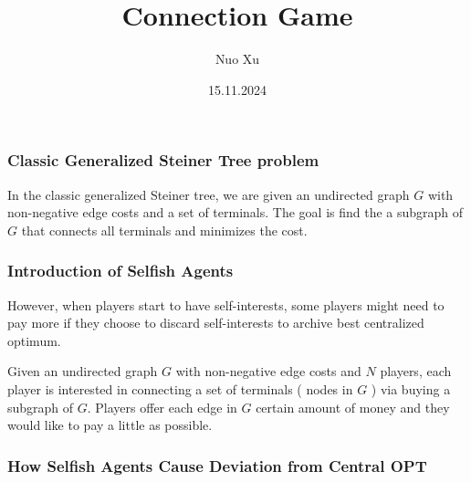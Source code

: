 \documentclass[11pt]{beamer}
\title{Connection Game}
\author{Nuo Xu}
\institute{Technical University of Munich}
\date{15.11.2024}
\begin{document}
\frame{\titlepage}

\begin{frame}
    \frametitle{Classic Generalized Steiner Tree problem}
    In the classic generalized Steiner tree, we are given an undirected graph \(G\) with non-negative edge costs and a set of terminals. The goal is find the a subgraph of \(G\) that connects all terminals and minimizes the cost. 
\end{frame}

\begin{frame}
    \frametitle{Introduction of Selfish Agents}
    However, when players start to have self-interests, some players might need to pay more if they choose to discard self-interests to archive best centralized optimum. 

Given an undirected graph \(G\) with non-negative edge costs and \(N\) players, each player is interested in connecting a set of terminals ( nodes in \(G\) ) via buying a subgraph of \(G\). Players offer each edge in \(G\) certain amount of money and they would like to pay a little as possible. 

\end{frame}


\begin{frame}
    \frametitle{How Selfish Agents Cause Deviation from Central OPT}
\end{frame}
\end{document}
